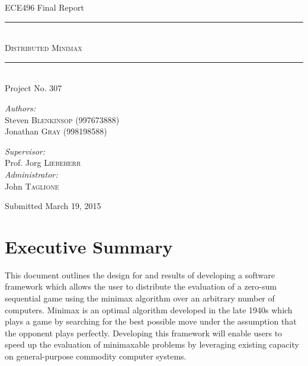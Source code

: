 \documentclass[pdftex,12pt,a4paper]{article}
\begin{document}
%
%
\begin{titlepage}
\vspace*{\fill}
\begin{center}

{\Large ECE496 Final Report}

\rule{\linewidth}{0.5mm}\\[0.3cm]
\textsc{\Huge Distributed Minimax}
\rule{\linewidth}{0.5mm}\\[0.3cm]

{\normalsize Project No. 307}\\[1cm]

\begin{multicols}{2}
\begin{flushleft}
\emph{Authors:}\\[0.1cm]
Steven \textsc{Blenkinsop} (997673888)\\[0.1cm]
Jonathan \textsc{Gray} (998198588)\\
\end{flushleft}
\columnbreak
\begin{flushright}
\emph{Supervisor:}\\[0.1cm]
Prof. Jorg \textsc{Liebeherr}\\[0.3cm]
\emph{Administrator:}\\[0.1cm]
John \textsc{Taglione}\\
\end{flushright}
\end{multicols}

\vfill
{\large Submitted March 19, 2015}

\end{center}
\vspace*{\fill}
\end{titlepage}

%
%
\section{Executive Summary}

This document outlines the design for and results of developing a software framework which allows the user to distribute the evaluation of a zero-sum sequential game using the minimax algorithm over an arbitrary number of computers. Minimax is an optimal algorithm developed in the late 1940s which plays a game by searching for the best possible move under the assumption that the opponent plays perfectly. Developing this framework will enable users to speed up the evaluation of minimaxable problems by leveraging existing capacity on general-purpose commodity computer systems.
\end{document}
